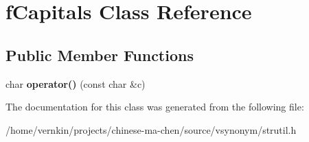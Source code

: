 \section{fCapitals Class Reference}
\label{classfCapitals}
\subsection*{Public Member Functions}
\begin{DoxyCompactItemize}
\item 
char {\bfseries operator()} (const char \&c)\label{classfCapitals_abeabec74424180506282b9e70d90276c}

\end{DoxyCompactItemize}


The documentation for this class was generated from the following file:\begin{DoxyCompactItemize}
\item 
/home/vernkin/projects/chinese-\/ma-\/chen/source/vsynonym/strutil.h\end{DoxyCompactItemize}

